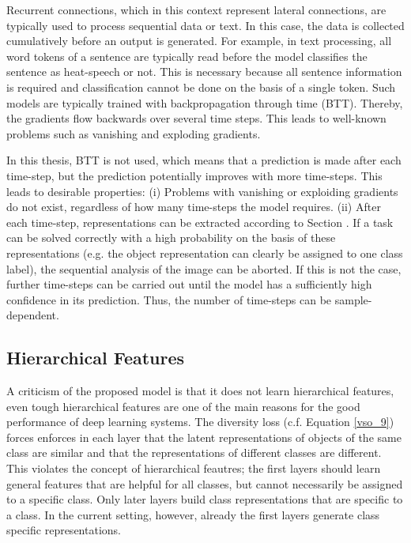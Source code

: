 Recurrent connections, which in this context represent lateral connections, are typically used to process sequential data or text. In this case, the data is collected cumulatively before an output is generated. For example, in text processing, all word tokens of a sentence are typically read before the model classifies the sentence as heat-speech or not. This is necessary because all sentence information is required and classification cannot be done on the basis of a single token. Such models are typically trained with backpropagation through time (BTT). Thereby, the gradients flow backwards over several time steps. This leads to well-known problems such as vanishing and exploding gradients.

In this thesis, BTT is not used, which means that a prediction is made after each time-step, but the prediction potentially improves with more time-steps. This leads to desirable properties: (i) Problems with vanishing or exploiding gradients do not exist, regardless of how many time-steps the model requires. (ii) After each time-step, representations can be extracted according to Section . If a task can be solved correctly with a high probability on the basis of these representations (e.g. the object representation can clearly be assigned to one class label), the sequential analysis of the image can be aborted. If this is not the case, further time-steps can be carried out until the model has a sufficiently high confidence in its prediction. Thus, the number of time-steps can be sample-dependent.




\subsection{Hierarchical Features}
A criticism of the proposed model is that it does not learn hierarchical features, even tough hierarchical features are one of the main reasons for the good performance of deep learning systems. The diversity loss (c.f. Equation \eqref{vso_9}) forces enforces in each layer that the latent representations of objects of the same class are similar and that the representations of different classes are different. This violates the concept of hierarchical feautres; the first layers should learn general features that are helpful for all classes, but cannot necessarily be assigned to a specific class. Only later layers build class representations that are specific to a class. In the current setting, however, already the first layers generate class specific representations.

